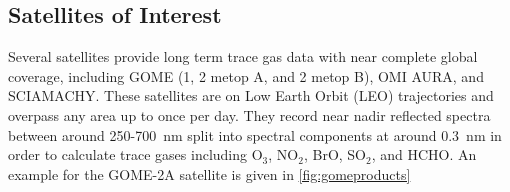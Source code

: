 \subsection{Satellites of Interest}

Several satellites provide long term trace gas data with near complete global coverage, including GOME (1, 2 metop A, and 2 metop B), OMI AURA, and SCIAMACHY.
These satellites are on Low Earth Orbit (LEO) trajectories and overpass any area up to once per day. 
They record near nadir reflected spectra between around 250-700~nm split into spectral components at around $0.3$~nm in order to calculate trace gases including O$_3$, NO$_2$, BrO, SO$_2$, and HCHO.
An example for the GOME-2A satellite is given in \ref{fig:gomeproducts}